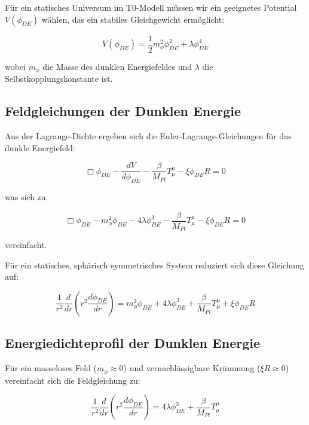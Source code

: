 \documentclass[a4paper,12pt]{article}
\begin{document}
Für ein statisches Universum im T0-Modell müssen wir ein geeignetes Potential $V(\phi_{DE})$ wählen, das ein stabiles Gleichgewicht ermöglicht:

\begin{equation}
	V(\phi_{DE}) = \frac{1}{2}m_{\phi}^2\phi_{DE}^2 + \lambda \phi_{DE}^4
\end{equation}

wobei $m_{\phi}$ die Masse des dunklen Energiefeldes und $\lambda$ die Selbstkopplungskonstante ist.

\subsection{Feldgleichungen der Dunklen Energie}

Aus der Lagrange-Dichte ergeben sich die Euler-Lagrange-Gleichungen für das dunkle Energiefeld:

\begin{equation}
	\Box\phi_{DE} - \frac{dV}{d\phi_{DE}} - \frac{\beta}{M_{Pl}}T^{\mu}_{\mu} - \xi \phi_{DE} R = 0
\end{equation}

was sich zu

\begin{equation}
	\Box\phi_{DE} - m_{\phi}^2\phi_{DE} - 4\lambda\phi_{DE}^3 - \frac{\beta}{M_{Pl}}T^{\mu}_{\mu} - \xi \phi_{DE} R = 0
\end{equation}

vereinfacht.

Für ein statisches, sphärisch symmetrisches System reduziert sich diese Gleichung auf:

\begin{equation}
	\frac{1}{r^2}\frac{d}{dr}\left(r^2\frac{d\phi_{DE}}{dr}\right) = m_{\phi}^2\phi_{DE} + 4\lambda\phi_{DE}^3 + \frac{\beta}{M_{Pl}}T^{\mu}_{\mu} + \xi \phi_{DE} R
\end{equation}

\subsection{Energiedichteprofil der Dunklen Energie}

Für ein masseloses Feld ($m_{\phi} \approx 0$) und vernachlässigbare Krümmung ($\xi R \approx 0$) vereinfacht sich die Feldgleichung zu:

\begin{equation}
	\frac{1}{r^2}\frac{d}{dr}\left(r^2\frac{d\phi_{DE}}{dr}\right) = 4\lambda\phi_{DE}^3 + \frac{\beta}{M_{Pl}}T^{\mu}_{\mu}
\end{equation}
\end{document}
